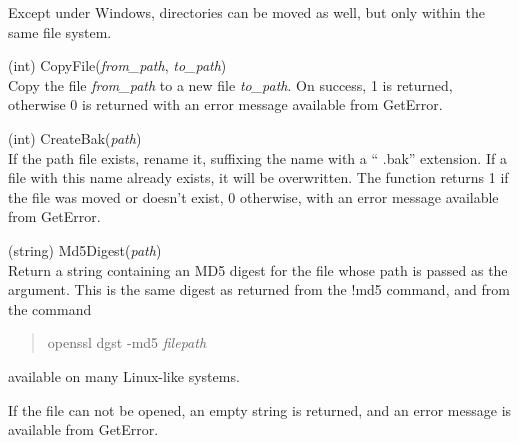\begin{description}
Except under Windows, directories can be moved as well, but only
within the same file system.

\item{(int) \vt CopyFile({\it from\_path}, {\it to\_path\/})}\\
Copy the file {\it from\_path} to a new file {\it to\_path\/}.  On
success, 1 is returned, otherwise 0 is returned with an error message
available from {\vt GetError}.

\item{(int) \vt CreateBak({\it path})}\\
If the path file exists, rename it, suffixing the name with a ``{\vt
.bak}'' extension.  If a file with this name already exists, it will
be overwritten.  The function returns 1 if the file was moved or
doesn't exist, 0 otherwise, with an error message available from {\vt
GetError}.

\item{(string) \vt Md5Digest({\it path})}\\
Return a string containing an MD5 digest for the file whose path is
passed as the argument.  This is the same digest as returned from the
{\cb !md5} command, and from the command
\begin{quote}
{\vt openssl dgst -md5} {\it filepath}
\end{quote}
available on many Linux-like systems.

If the file can not be opened, an empty string is returned, and an
error message is available from {\vt GetError}.
\end{description}


